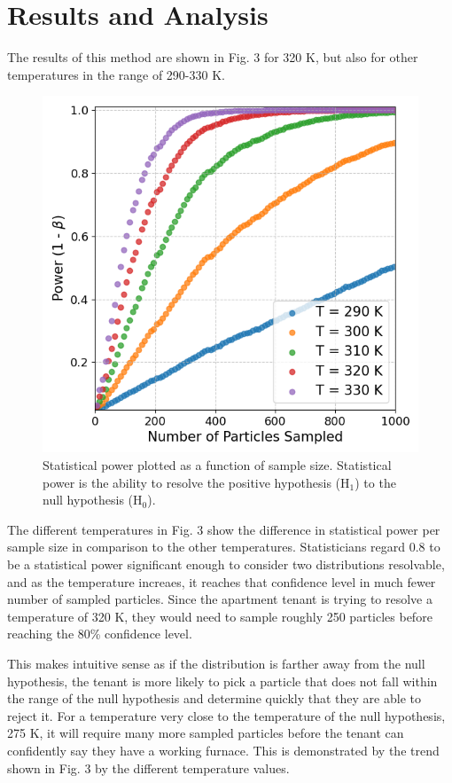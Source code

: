 \documentclass[%
 reprint,
 amsmath,amssymb,
 aps,
]{revtex4-2}
\begin{document}
\section{Results and Analysis}

The results of this method are shown in Fig. 3 for 320 K, but also for other temperatures in the range of 290-330 K.

\begin{figure}[h]
	\caption{Statistical power plotted as a function of sample size. Statistical power is the ability to resolve the positive hypothesis (H$_1$) to the null hypothesis (H$_0$). }
	\centering
	\includegraphics[scale=0.51]{results1.png}
\end{figure}

The different temperatures in Fig. 3 show the difference in statistical power per sample size in comparison to the other temperatures. Statisticians regard 0.8 to be a statistical power significant enough to consider two distributions resolvable, and as the temperature increaes, it reaches that confidence level in much fewer number of sampled particles. Since the apartment tenant is trying to resolve a temperature of 320 K, they would need to sample roughly 250 particles before reaching the 80\% confidence level.

This makes intuitive sense as if the distribution is farther away from the null hypothesis, the tenant is more likely to pick a particle that does not fall within the range of the null hypothesis and determine quickly that they are able to reject it. For a temperature very close to the temperature of the null hypothesis, 275 K, it will require many more sampled particles before the tenant can confidently say they have a working furnace. This is demonstrated by the trend shown in Fig. 3 by the different temperature values. 
\end{document}
